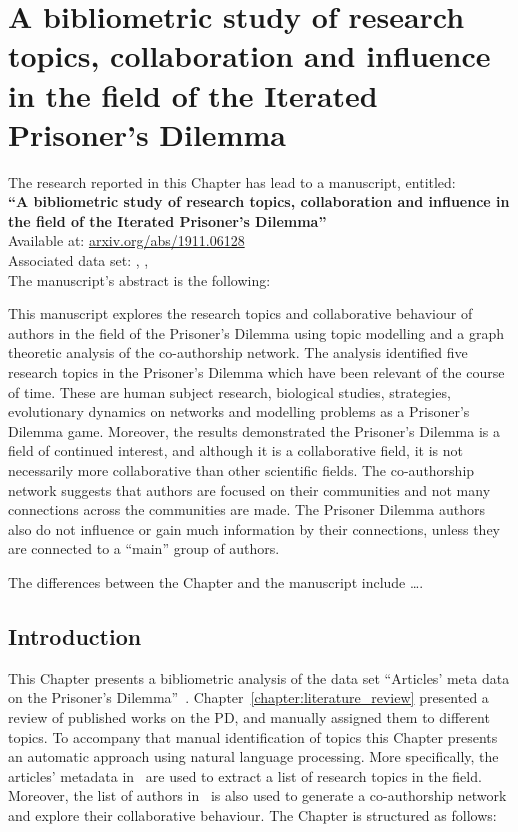 \chapter{A bibliometric study of research topics, collaboration and influence in
the field of the Iterated Prisoner's Dilemma}\label{chapter:bibliometric_study}

\begin{center}
    The research reported in this Chapter has lead to a manuscript, entitled: \\
    \textbf{``A bibliometric study of research topics, collaboration and influence in the field of the Iterated Prisoner's Dilemma''} \\
    Available at: \url{arxiv.org/abs/1911.06128} \\
    Associated data set: \cite{auction_data_2018}, \cite{anarchy_data_2018}, \cite{pd_data_2018}\\ \vspace{.5cm}
    The manuscript's abstract is the following:
\end{center}

This manuscript explores the research topics and collaborative behaviour of
authors in the field of the Prisoner's Dilemma using topic modelling and a graph
theoretic analysis of the co-authorship network. The analysis identified five
research topics in the Prisoner's Dilemma which have been relevant of the course
of time. These are human subject research, biological studies, strategies,
evolutionary dynamics on networks and modelling problems as a Prisoner's Dilemma
game. Moreover, the results demonstrated the Prisoner's Dilemma is a field of
continued interest, and although it is a collaborative field, it is not
necessarily more collaborative than other scientific fields. The co-authorship
network suggests that authors are focused on their communities and not many
connections across the communities are made. The Prisoner Dilemma authors also
do not influence or gain much information by their connections, unless they are
connected to a ``main'' group of authors.

The differences between the Chapter and the manuscript include \dots.   %
\newpage

\section{Introduction}\label{section:introduction}

This Chapter presents a bibliometric analysis of the data set
``Articles' meta data on the Prisoner's Dilemma''~\cite{pd_data_2018}.
Chapter~\ref{chapter:literature_review} presented a review of published works on
the PD, and manually assigned them to different topics. To accompany that
manual identification of topics this Chapter presents an automatic approach
using natural language processing. More specifically, the \totalarticles articles' metadata
in~\cite{pd_data_2018} are used to extract a list of research topics in the field.
Moreover, the list of authors in~\cite{pd_data_2018} is also used to generate a
co-authorship network and explore their collaborative behaviour.
The Chapter is structured as follows:

